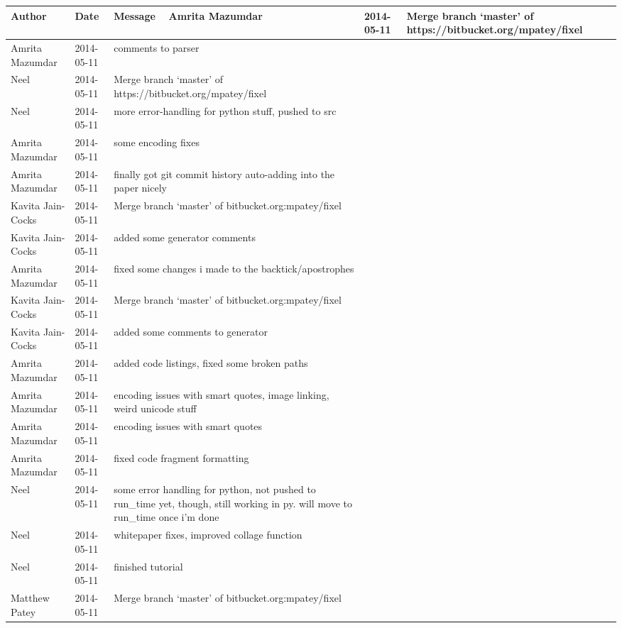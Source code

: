 \begin{center}
\begin{longtabu} to \textwidth {|
    X[4,l]|
    X[3,c]|
    X[8,l]|}
    \hline
    \textbf{Author} & \textbf{Date} & \textbf{Message} \ \hline
Amrita Mazumdar & 2014-05-11 & Merge branch `master' of https://bitbucket.org/mpatey/fixel \\ \hline
Amrita Mazumdar & 2014-05-11 & comments to parser \\ \hline
Neel & 2014-05-11 & Merge branch `master' of https://bitbucket.org/mpatey/fixel \\ \hline
Neel & 2014-05-11 & more error-handling for python stuff, pushed to src \\ \hline
Amrita Mazumdar & 2014-05-11 & some encoding fixes \\ \hline
Amrita Mazumdar & 2014-05-11 & finally got git commit history auto-adding into the paper nicely \\ \hline
Kavita Jain-Cocks & 2014-05-11 & Merge branch `master' of bitbucket.org:mpatey/fixel \\ \hline
Kavita Jain-Cocks & 2014-05-11 & added some generator comments \\ \hline
Amrita Mazumdar & 2014-05-11 & fixed some changes i made to the backtick/apostrophes \\ \hline
Kavita Jain-Cocks & 2014-05-11 & Merge branch `master' of bitbucket.org:mpatey/fixel \\ \hline
Kavita Jain-Cocks & 2014-05-11 & added some comments to generator \\ \hline
Amrita Mazumdar & 2014-05-11 & added code listings, fixed some broken paths \\ \hline
Amrita Mazumdar & 2014-05-11 & encoding issues with smart quotes, image linking, weird unicode stuff \\ \hline
Amrita Mazumdar & 2014-05-11 & encoding issues with smart quotes \\ \hline
Amrita Mazumdar & 2014-05-11 & fixed code fragment formatting \\ \hline
Neel & 2014-05-11 & some error handling for python, not pushed to run\_time yet, though, still working in py. will move to run\_time once i'm done \\ \hline
Neel & 2014-05-11 & whitepaper fixes, improved collage function \\ \hline
Neel & 2014-05-11 & finished tutorial \\ \hline
Matthew Patey & 2014-05-11 & Merge branch `master' of bitbucket.org:mpatey/fixel \\ \hline

\end{longtabu}
\end{center}
